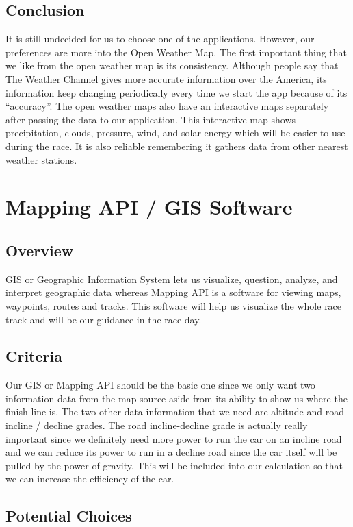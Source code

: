 \documentclass[onecolumn, draftclsnofoot,10pt, compsoc]{IEEEtran}
\begin{document}
\begin{singlespace}
\subsection{Conclusion}
It is still undecided for us to choose one of the applications. However, our preferences are more into the Open Weather Map. The first important thing that we like from the open weather map is its consistency. Although people say that The Weather Channel gives more accurate information over the America, its information keep changing periodically every time we start the app because of its “accuracy”. The open weather maps also have an interactive maps separately after passing the data to our application. This interactive map shows precipitation, clouds, pressure, wind, and solar energy which will be easier to use during the race. It is also reliable remembering it gathers data from other nearest weather stations.   



\section{Mapping API  / GIS Software}

\subsection{Overview}
GIS or Geographic Information System lets us visualize, question, analyze, and interpret geographic data whereas Mapping API is a software for viewing maps, waypoints, routes and tracks. This software will help us visualize the whole race track and will be our guidance in the race day. 

\subsection{Criteria}
Our GIS or Mapping API should be the basic one since we only want two information data from the map source aside from its ability to show us where the finish line is. The two other data information that we need are altitude and road incline / decline grades. The road incline-decline grade is actually really important since we definitely need more power to run the car on an incline road and we can reduce its power to run in a decline road since the car itself will be pulled by the power of gravity. This will be included into our calculation so that we can increase the efficiency of the car. 

\subsection{Potential Choices}


\end{singlespace}
\end{document}

